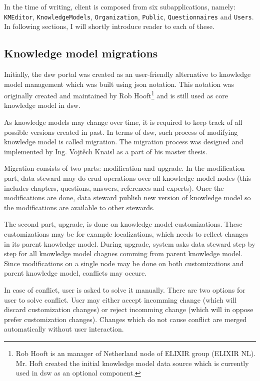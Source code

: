 In the time of writing, client is composed from six subapplications, namely: \texttt{KMEditor}, \texttt{KnowledgeModels}, \texttt{Organization}, \texttt{Public}, \texttt{Questionnaires} and \texttt{Users}.
In following sections, I will shortly introduce reader to each of these.


\subsection{Knowledge model migrations}\label{sec:km-migrations}

Initially, the \gls{dsw} portal was created as an user-friendly alternative to knowledge model management which was built using \gls{json} notation.
This notation was originally created and maintained by Rob Hooft\footnote{Rob Hooft is an manager of Netherland node of ELIXIR group (ELIXIR NL). Mr. Hoft created the initial knowledge model data source which is currently used in \gls{dsw} as an optional component.} and is still used as core knowledge model in \gls{dsw}.

As knowledge models may change over time, it is required to keep track of all possible versions created in past.
In terms of \gls{dsw}, such process of modifying knowledge model is called migration.
The migration process was designed and implemented by Ing. Vojtěch Knaisl as a part of his master thesis\cite{mt-knaisl}.

Migration consists of two parts: modification and upgrade.
In the modification part, data steward may do \gls{crud} operations over all knowledge model nodes (this includes chapters, questions, answers, references and experts).
Once the modifications are done, data steward publish new version of knowledge model so the modifications are available to other stewards.

The second part, upgrade, is done on knowledge model customizations.
These customizations may be for example localizations, which needs to reflect changes in its parent knowledge model.
During upgrade, system asks data steward step by step for all knowledge model chagnes comming from parent knowledge model.
Since modifications on a single node may be done on both customizations and parent knowledge model, conflicts may occure.

In case of conflict, user is asked to solve it manually.
There are two options for user to solve conflict.
User may either accept incomming change (which will discard customization changes) or reject incomming change (which will in oppose prefer customization changes).
Changes which do not cause conflict are merged automatically without user interaction.

